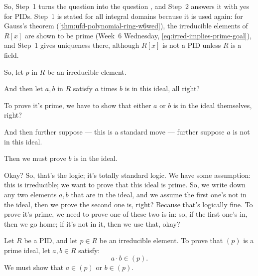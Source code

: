 \begin{content}
\begin{steps}
\begin{description}
\end{description}
So, Step~1 turns the question  into the question , and Step~2 answers it with yes for PIDs. Step~1 is stated for all integral domains because it is used again: for Gauss's theorem (\cref{thm:ufd-polynomial-ring-w6wed}), the irreducible elements of $R[x]$ are shown to be prime (Week~6 Wednesday, \eqref{eq:irred-implies-prime-goal}), and Step~1 gives uniqueness there, although $R[x]$ is not a PID unless $R$ is a field.
\end{steps}
\end{content}

\begin{proofWrapper}
\begin{speech}[00:47:07 - 00:48:42]
So, let $p$ in $R$  be an irreducible element. 

And then let $a, b$ in $R$  satisfy $a$ times $b$ is in this ideal, all right? 

To prove it's prime, we have to show that either $a$ or $b$ is in the ideal themselves, right?

And then further suppose --- this is a standard move --- further suppose  $a$ is not in this ideal. 

Then we must prove  $b$ is in the ideal. 

Okay? So, that's the logic; it's totally standard logic. We have some assumption: this is irreducible; we want to prove that this ideal is prime. So, we write down any two elements $a, b$ that are in the ideal, and we assume the first one's not in the ideal, then we prove the second one is, right? Because that's logically fine. To prove it's prime, we need to prove one of these two is in: so, if the first one's in, then we go home; if it's not in it, then we use that, okay?
\end{speech}

\begin{content}
Let $R$ be a PID, and let $p \in R$ be an irreducible element. To prove that $(p)$ is a prime ideal, let $a, b \in R$ satisfy:
\begin{equation}\label{eq:part3-ab-in-p}
a \cdot b \in (p).
\end{equation}
We must show that $a \in (p)$ or $b \in (p)$.


\end{content}
\end{proofWrapper}
